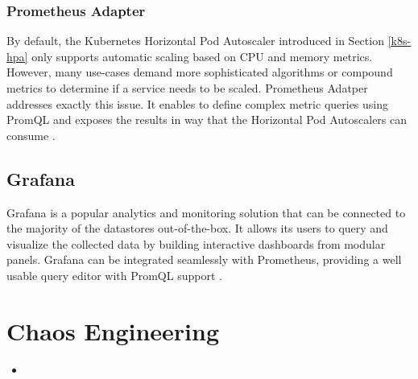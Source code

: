 \subsubsection{Prometheus Adapter}

By default, the Kubernetes Horizontal Pod Autoscaler introduced in Section \ref{k8s-hpa} only supports automatic scaling based on CPU and memory metrics. However, many use-cases demand more sophisticated algorithms or compound metrics to determine if a service needs to be scaled. Prometheus Adatper addresses exactly this issue. It enables to define complex metric queries using PromQL and exposes the results in way that the Horizontal Pod Autoscalers can consume \cite{PrometheusAdapter}.

\subsection{Grafana}

Grafana is a popular analytics and monitoring solution that can be connected to the majority of the datastores out-of-the-box. It allows its users to query and visualize the collected data by building interactive dashboards from modular panels. Grafana can be integrated seamlessly with Prometheus, providing a well usable query editor with PromQL support \cite{Grafana}.


\section{Chaos Engineering}

\begin{itemize}
	\item 
\end{itemize}

